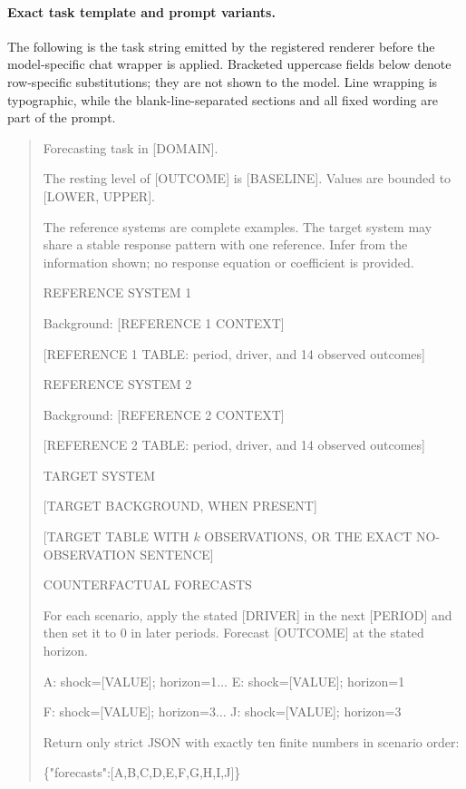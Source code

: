 \paragraph{Exact task template and prompt variants.}
\label{app:exp3-coin-prompts}
The following is the task string emitted by the registered renderer before the
model-specific chat wrapper is applied. Bracketed uppercase fields below denote
row-specific substitutions; they are not shown to the model. Line wrapping is
typographic, while the blank-line-separated sections and all fixed wording are
part of the prompt.

\begin{quote}
\begingroup\ttfamily\scriptsize\raggedright
Forecasting task in [DOMAIN].

\smallskip
The resting level of [OUTCOME] is [BASELINE]. Values are bounded to
[LOWER, UPPER].

\smallskip
The reference systems are complete examples. The target system may share a
stable response pattern with one reference. Infer from the information shown;
no response equation or coefficient is provided.

\smallskip
REFERENCE SYSTEM 1

Background: [REFERENCE 1 CONTEXT]

[REFERENCE 1 TABLE: period, driver, and 14 observed outcomes]

\smallskip
REFERENCE SYSTEM 2

Background: [REFERENCE 2 CONTEXT]

[REFERENCE 2 TABLE: period, driver, and 14 observed outcomes]

\smallskip
TARGET SYSTEM

[TARGET BACKGROUND, WHEN PRESENT]

[TARGET TABLE WITH $k$ OBSERVATIONS, OR THE EXACT NO-OBSERVATION SENTENCE]

\smallskip
COUNTERFACTUAL FORECASTS

For each scenario, apply the stated [DRIVER] in the next [PERIOD] and then set it
to 0 in later periods. Forecast [OUTCOME] at the stated horizon.

\smallskip
A: shock=[VALUE]; horizon=1\quad $\ldots$\quad
E: shock=[VALUE]; horizon=1

F: shock=[VALUE]; horizon=3\quad $\ldots$\quad
J: shock=[VALUE]; horizon=3

\smallskip
Return only strict JSON with exactly ten finite numbers in scenario order:

\{"forecasts":[A,B,C,D,E,F,G,H,I,J]\}
\endgroup
\end{quote}

